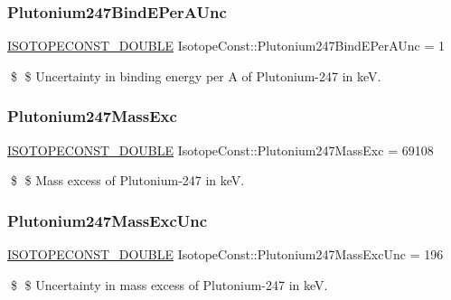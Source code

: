 \subsubsection{\texorpdfstring{Plutonium247\+Bind\+E\+Per\+A\+Unc}{Plutonium247BindEPerAUnc}}
{\footnotesize\ttfamily \mbox{\hyperlink{group___isotope_const-_macros_ga8f45a7272ce02c0b4c65c44636ed719a}{I\+S\+O\+T\+O\+P\+E\+C\+O\+N\+S\+T\+\_\+\+D\+O\+U\+B\+LE}} Isotope\+Const\+::\+Plutonium247\+Bind\+E\+Per\+A\+Unc = 1}

\$ \$ Uncertainty in binding energy per A of Plutonium-\/247 in keV. \mbox{\label{group___isotope_const-_plutonium-_pu247_ga717540b5a22958304971cbb298916ea3}} 
\subsubsection{\texorpdfstring{Plutonium247\+Mass\+Exc}{Plutonium247MassExc}}
{\footnotesize\ttfamily \mbox{\hyperlink{group___isotope_const-_macros_ga8f45a7272ce02c0b4c65c44636ed719a}{I\+S\+O\+T\+O\+P\+E\+C\+O\+N\+S\+T\+\_\+\+D\+O\+U\+B\+LE}} Isotope\+Const\+::\+Plutonium247\+Mass\+Exc = 69108}

\$ \$ Mass excess of Plutonium-\/247 in keV. \mbox{\label{group___isotope_const-_plutonium-_pu247_gaa640d7b1a76ce9fa99504da3b4168d33}} 
\subsubsection{\texorpdfstring{Plutonium247\+Mass\+Exc\+Unc}{Plutonium247MassExcUnc}}
{\footnotesize\ttfamily \mbox{\hyperlink{group___isotope_const-_macros_ga8f45a7272ce02c0b4c65c44636ed719a}{I\+S\+O\+T\+O\+P\+E\+C\+O\+N\+S\+T\+\_\+\+D\+O\+U\+B\+LE}} Isotope\+Const\+::\+Plutonium247\+Mass\+Exc\+Unc = 196}

\$ \$ Uncertainty in mass excess of Plutonium-\/247 in keV. \mbox{\label{group___isotope_const-_plutonium-_pu247_gaab8d6af78e125075d87cff3ac56734a9}} 
